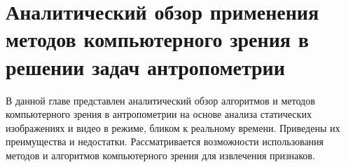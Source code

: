 \chapter{Аналитический обзор применения методов компьютерного зрения в решении задач антропометрии} \label{chapt1_intro}

В данной главе представлен аналитический обзор алгоритмов и методов компьютерного зрения в антропометрии на основе анализа статических изображениях и видео в режиме, бликом к реальному времени. Приведены их преимущества и недостатки. Рассматривается возможности использования методов и алгоритмов компьютерного зрения для извлечения признаков.









